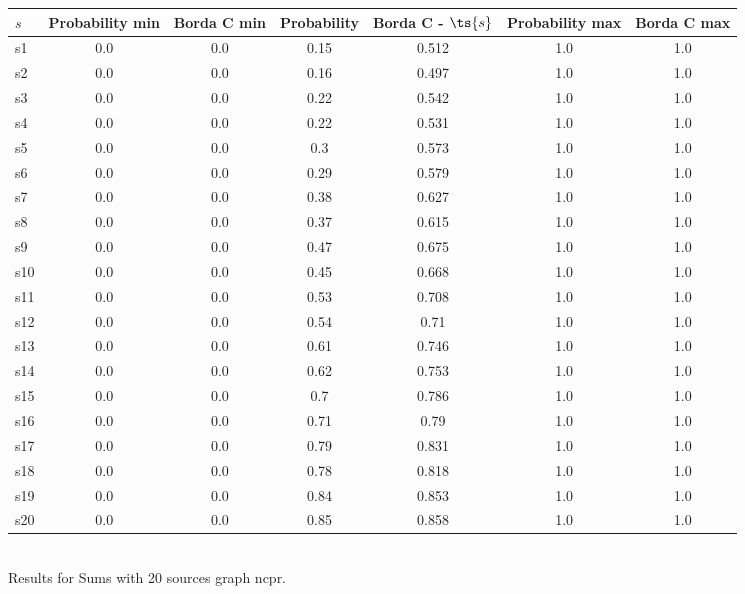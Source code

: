 \documentclass{article}
\begin{document}
\noindent\begin{tabular}{|l|c|c|c|c|c|c|}
\hline
$s$& Probability min & Borda C min & Probability & Borda C - $\ts{s}$ & Probability max & Borda C max\\
\hline
s1 &0.0 & 0.0 & 0.15 & 0.512 & 1.0 & 1.0\\
\hline
s2 &0.0 & 0.0 & 0.16 & 0.497 & 1.0 & 1.0\\
\hline
s3 &0.0 & 0.0 & 0.22 & 0.542 & 1.0 & 1.0\\
\hline
s4 &0.0 & 0.0 & 0.22 & 0.531 & 1.0 & 1.0\\
\hline
s5 &0.0 & 0.0 & 0.3 & 0.573 & 1.0 & 1.0\\
\hline
s6 &0.0 & 0.0 & 0.29 & 0.579 & 1.0 & 1.0\\
\hline
s7 &0.0 & 0.0 & 0.38 & 0.627 & 1.0 & 1.0\\
\hline
s8 &0.0 & 0.0 & 0.37 & 0.615 & 1.0 & 1.0\\
\hline
s9 &0.0 & 0.0 & 0.47 & 0.675 & 1.0 & 1.0\\
\hline
s10 &0.0 & 0.0 & 0.45 & 0.668 & 1.0 & 1.0\\
\hline
s11 &0.0 & 0.0 & 0.53 & 0.708 & 1.0 & 1.0\\
\hline
s12 &0.0 & 0.0 & 0.54 & 0.71 & 1.0 & 1.0\\
\hline
s13 &0.0 & 0.0 & 0.61 & 0.746 & 1.0 & 1.0\\
\hline
s14 &0.0 & 0.0 & 0.62 & 0.753 & 1.0 & 1.0\\
\hline
s15 &0.0 & 0.0 & 0.7 & 0.786 & 1.0 & 1.0\\
\hline
s16 &0.0 & 0.0 & 0.71 & 0.79 & 1.0 & 1.0\\
\hline
s17 &0.0 & 0.0 & 0.79 & 0.831 & 1.0 & 1.0\\
\hline
s18 &0.0 & 0.0 & 0.78 & 0.818 & 1.0 & 1.0\\
\hline
s19 &0.0 & 0.0 & 0.84 & 0.853 & 1.0 & 1.0\\
\hline
s20 &0.0 & 0.0 & 0.85 & 0.858 & 1.0 & 1.0\\
\hline
\end{tabular}\\

\noindent Results for Sums with 20 sources graph ncpr.
\end{document}
